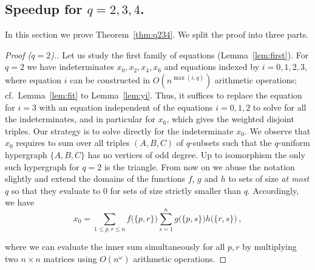 \documentclass{amsart}
\begin{document}
\subsection{Speedup for $q=2,3,4$.}
\label{sect:q234}

In this section we prove Theorem~\ref{thm:q234}. We split the proof
into three parts.

\begin{proof}[Proof ($q=2$).]
Let us study the first family of equations (Lemma~\ref{lem:first}). 
For $q=2$ we have indeterminates $x_0,x_2,x_4,x_6$ and
equations indexed by $i=0,1,2,3$, where equation $i$ can be 
constructed in $O(n^{\max(i,q)})$ arithmetic operations;
cf.~Lemma~\ref{lem:fit} to Lemma~\ref{lem:yi}.
Thus, it suffices to replace the equation for $i=3$ with an 
equation independent of the equations $i=0,1,2$ to solve
for all the indeterminates, and in particular for $x_6$, which
gives the weighted disjoint triples. Our strategy is to solve 
directly for the indeterminate $x_0$. We observe that $x_0$ requires
to sum over all triples $(A,B,C)$ of $q$-subsets such that
the $q$-uniform hypergraph $\{A,B,C\}$ has no vertices of 
odd degree. 
Up to isomorphism the only such hypergraph
for $q=2$ is the triangle.
From now on we abuse the notation slightly and extend the domains of the functions $f$, $g$ and $h$ to sets of size {\em at most $q$} so that they evaluate to $0$ for sets of size strictly smaller than $q$.
Accordingly, we have
\begin{equation}
\label{eq:2-uniform-x0} 
x_0=\sum_{1\leq p,r\leq n}f\bigl(\{p,r\}\bigr)\sum_{s=1}^ng\bigl(\{p,s\}\bigr)h\bigl(\{r,s\}\bigr)\,,
\end{equation}

where we can evaluate the inner sum simultaneously for all $p,r$ 
by multiplying two $n\times n$ matrices using $O(n^{\omega})$
arithmetic operations.
\end{proof}
\end{document}
